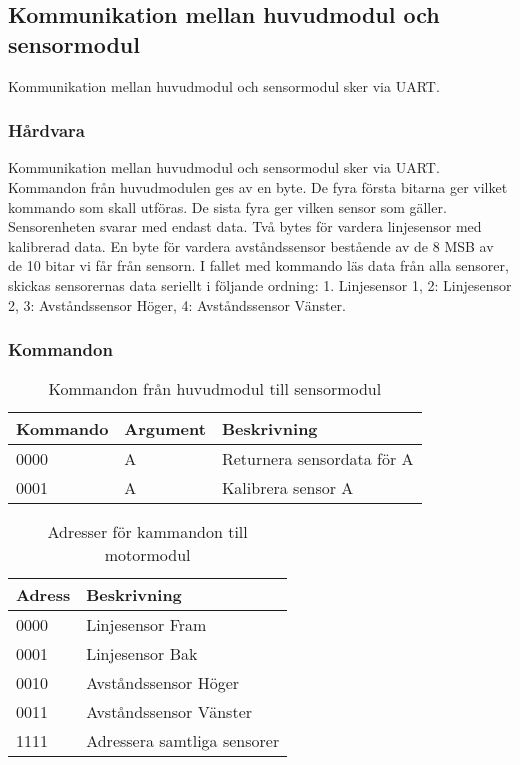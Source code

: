 \subsection{Kommunikation mellan huvudmodul och sensormodul}
Kommunikation mellan huvudmodul och sensormodul sker via UART. 

\subsubsection{Hårdvara}
Kommunikation mellan huvudmodul och sensormodul sker via UART. Kommandon från huvudmodulen ges av en byte. De fyra första bitarna ger vilket kommando som skall utföras. De sista fyra ger vilken sensor som gäller. 
Sensorenheten svarar med endast data. Två bytes för vardera linjesensor med kalibrerad data. En byte för vardera avståndssensor bestående av de 8 MSB av de 10 bitar vi får från sensorn. I fallet med kommando läs data från alla sensorer, skickas sensorernas data seriellt i följande ordning: 1. Linjesensor 1, 2: Linjesensor 2, 3: Avståndssensor Höger, 4: Avståndssensor Vänster.

\subsubsection{Kommandon}

\begin{table}[h]
	\centering
		\begin{tabularx}{\textwidth}{| l | l | X |}
			\hline
			\textbf{Kommando} & \textbf{Argument} & \textbf{Beskrivning} \\
			\hline
			{0000} & {A} & {Returnera sensordata för A} \\
			\hline
			{0001} & {A} & {Kalibrera sensor A} \\
			\hline
		\end{tabularx}
	\caption{Kommandon från huvudmodul till sensormodul} \label{protokoll:huvud-sensor}
\end{table}

\begin{table}[h]
	\centering
		\begin{tabularx}{\textwidth}{| l | X |}
			\hline
			\textbf{Adress} & \textbf{Beskrivning} \\
			\hline
			{0000} & {Linjesensor Fram} \\
			\hline
			{0001} & {Linjesensor Bak} \\
			\hline
			{0010} & {Avståndssensor Höger} \\
			\hline
			{0011} & {Avståndssensor Vänster} \\
			\hline
			{1111} & {Adressera samtliga sensorer} \\
			\hline
		\end{tabularx}
	\caption{Adresser för kammandon till motormodul} \label{protokoll:huvud-sensor-adress}
\end{table}

